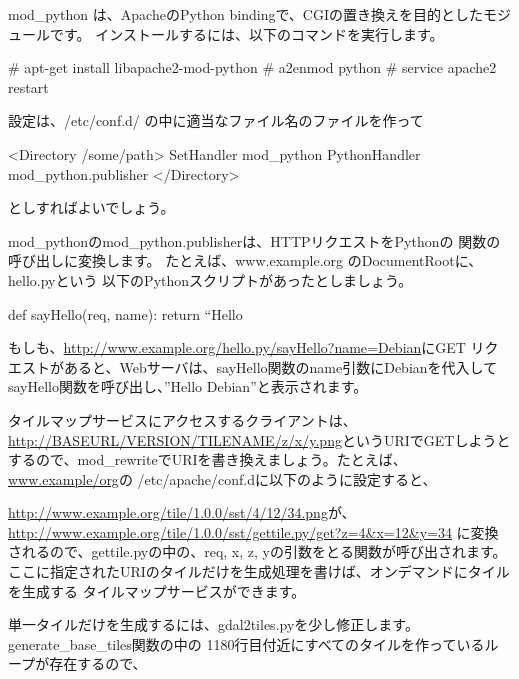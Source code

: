 \documentclass[mingoth,a4paper]{jsarticle}
\begin{document}
mod\_python は、ApacheのPython bindingで、CGIの置き換えを目的としたモジュールです。
インストールするには、以下のコマンドを実行します。
\begin{commandline}
# apt-get install libapache2-mod-python
# a2enmod python
# service apache2 restart
\end{commandline}
設定は、/etc/conf.d/ の中に適当なファイル名のファイルを作って
\begin{commandline}
<Directory /some/path>
  SetHandler mod_python
  PythonHandler mod_python.publisher
</Directory>
\end{commandline}
としすればよいでしょう。

mod\_pythonのmod\_python.publisherは、HTTPリクエストをPythonの
関数の呼び出しに変換します。
たとえば、www.example.org のDocumentRootに、hello.pyという
以下のPythonスクリプトがあったとしましょう。
\begin{commandline}
def sayHello(req, name):
  return ``Hello %
\end{commandline}
もしも、\url{http://www.example.org/hello.py/sayHello?name=Debian}にGET
リクエストがあると、Webサーバは、sayHello関数のname引数にDebianを代入して
sayHello関数を呼び出し、''Hello Debian''と表示されます。

タイルマップサービスにアクセスするクライアントは、
\url{http://BASEURL/VERSION/TILENAME/z/x/y.png}というURIでGETしようと
するので、mod\_rewriteでURIを書き換えましょう。たとえば、\url{www.example/org}の
/etc/apache/conf.dに以下のように設定すると、
%
%
\url{http://www.example.org/tile/1.0.0/sst/4/12/34.png}が、
\url{http://www.example.org/tile/1.0.0/sst/gettile.py/get?z=4&x=12&y=34}
に変換されるので、gettile.pyの中の、req, x, z, yの引数をとる関数が呼び出されます。
ここに指定されたURIのタイルだけを生成処理を書けば、オンデマンドにタイルを生成する
タイルマップサービスができます。


単一タイルだけを生成するには、gdal2tiles.pyを少し修正します。
generate\_base\_tiles関数の中の
1180行目付近にすべてのタイルを作っているループが存在するので、
\end{document}
